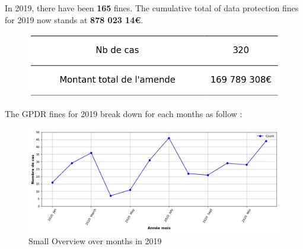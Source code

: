 \documentclass[12pt]{article}
\begin{document}
\newpage




	\begin{multicols}{2}
	
	In 2019, there have been \textbf{165} fines.
	The cumulative total of data protection fines for 2019 now stands at \textbf{878 023 14€}.
	
	\begin{figure}[H]
	\centering\includegraphics[width=1\linewidth]{graphs/counter_year}
	\end{figure}


	The GPDR fines for 2019 break down for each months as follow :

	\begin{figure}
	[H]\centering\includegraphics[width = 1.2\linewidth]{graphs/NbFinesPerMonth_year_graph}
	\caption{Small Overview over months in 2019}
	\end{figure}

	\end{multicols}
\end{document}
